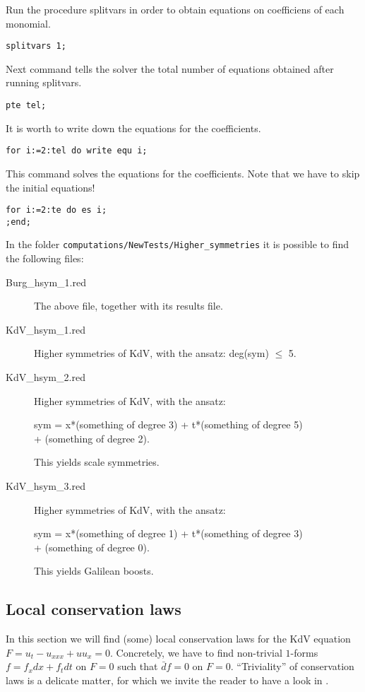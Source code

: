 \documentclass[12pt]{amsart}
\theoremstyle{definition}
\begin{document}
Run the procedure splitvars in order to obtain equations on coefficiens
of each monomial.
\begin{verbatim}
splitvars 1;
\end{verbatim}

Next command tells the solver the total number of equations obtained
after running splitvars.
\begin{verbatim}
pte tel;
\end{verbatim}

It is worth to write down the equations for the coefficients.
\begin{verbatim}
for i:=2:tel do write equ i;
\end{verbatim}

This command solves the equations for the coefficients.
Note that we have to skip the initial equations!
\begin{verbatim}
for i:=2:te do es i;
;end;
\end{verbatim}

In the folder \texttt{computations/NewTests/Higher\_symmetries} it is possible
to find the following files:
\begin{description}
\item[Burg\_hsym\_1.red] The above file, together with its results file.
  \item[KdV\_hsym\_1.red] Higher symmetries of KdV, with the ansatz:
    deg(sym) $\leq$ 5.
\item[KdV\_hsym\_2.red] Higher symmetries of KdV, with the ansatz:
  \begin{center}
    sym = x*(something of degree 3) + t*(something of degree  5)\\
  + (something of degree 2).
  \end{center}
    This yields scale symmetries.
\item[KdV\_hsym\_3.red] Higher symmetries of KdV, with the ansatz:
  \begin{center}
    sym = x*(something of degree 1) + t*(something of degree 3)\\
    + (something of degree 0).
  \end{center}
This yields Galilean boosts.
\end{description}

\subsection{Local conservation laws}
\label{sec:local-cons-laws}

In this section we will find (some) local conservation laws for the KdV
equation $F=u_t-u_{xxx}+uu_x=0$. Concretely, we have to find non-trivial $1$-forms
$f=f_xdx+f_tdt$ on $F=0$ such that $\bar d f=0$ on $F=0$. ``Triviality'' of
conservation laws is a delicate matter, for which we invite the reader to have
a look in \cite{Many}.
\end{document}
